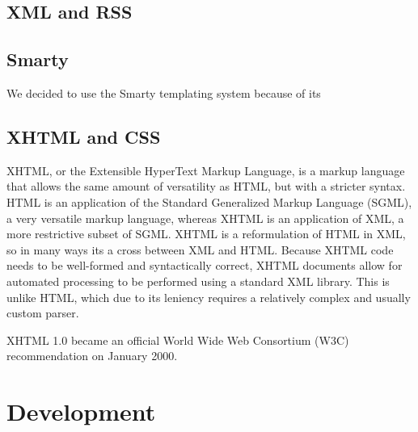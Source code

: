 \documentclass[a4paper,12pt]{report}
\begin{document}
\begin{description}
\section{XML and RSS}


\section{Smarty}
We decided to use the Smarty templating system because of its 

\section{XHTML and CSS}
XHTML, or the Extensible HyperText Markup Language, is a markup language that allows the same amount of versatility as HTML, but with a stricter syntax. 
HTML is an application of the Standard Generalized Markup Language (SGML), a very versatile markup language, whereas XHTML is an application of XML, a more restrictive subset of SGML. 
XHTML is a reformulation of HTML in XML, so in many ways its a cross between XML and HTML. 
Because XHTML code needs to be well-formed and syntactically correct, XHTML documents allow for automated processing to be performed using a standard XML library. 
This is unlike HTML, which due to its leniency requires a relatively complex and usually custom parser. 

XHTML 1.0 became an official World Wide Web Consortium (W3C) recommendation on January 2000. 


\chapter{Development}


\end{description}
\end{document}
